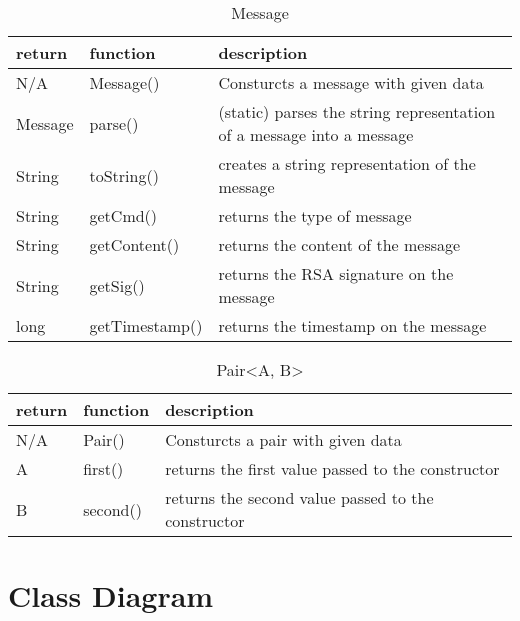 \begin{table}[h]
    \centering
    \begin{tabular}{p{1cm}p{2.6cm}p{9cm}}
    return  & function       & description\\ \hline
    N/A     & Message()      & Consturcts a message with given data\\
    
    Message & parse()        & (static) parses the string representation of a message into a message\\
    
    String  & toString()     & creates a string representation of the message\\
    String  & getCmd()       & returns the type of message\\
    String  & getContent()   & returns the content of the message\\
    String  & getSig()       & returns the RSA signature on the message\\
    long    & getTimestamp() & returns the timestamp on the message\\
    \end{tabular}
    \caption{Message}
\end{table}

\begin{table}[h]
    \centering
    \begin{tabular}{p{1cm}p{2cm}p{9cm}}
    return & function & description\\ \hline
    
    N/A    & Pair()   & Consturcts a pair with given data\\
    A      & first()  & returns the first value passed to the constructor\\
    B      & second() & returns the second value passed to the constructor\\
    \end{tabular}
    \caption{Pair\textless A, B\textgreater }
\end{table}

\section{Class Diagram}
